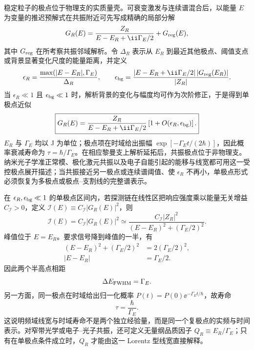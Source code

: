 稳定粒子的极点位于物理支的实质量壳。可衰变激发与连续谱混合后，以能量 $E$ 为变量的推迟预解式在共振附近可先写成精确的局部分解
\begin{equation*}
 G_R(E)
 =\frac{Z_R}{E-E_R+\ii\Gamma_E/2}+G_{\rm reg}(E),
\end{equation*}
其中 $G_{\rm reg}$ 在所考察共振邻域解析。令 $\Delta_R$ 表示从 $E_R$ 到最近其他极点、阈值支点或背景显著变化尺度的能量距离，并定义
\begin{equation*}
 \epsilon_R
 =\frac{\max(|E-E_R|,\Gamma_E)}{\Delta_R},
 \qquad
 \epsilon_{\rm bg}
 =\frac{|E-E_R+\ii\Gamma_E/2|\,|G_{\rm reg}(E_R)|}{|Z_R|}.
\end{equation*}
当 $\epsilon_R\ll1$ 且 $\epsilon_{\rm bg}\ll1$ 时，解析背景的变化与幅度均可作为次阶修正，于是得到单极点近似
\begin{equation}
 \boxed{
 G_R(E)
 =\frac{Z_R}{E-E_R+\ii\Gamma_E/2}
 \left[1+O(\epsilon_R,\epsilon_{\rm bg})\right].}
 \label{eq:resonance-pole-SI-r12}
\end{equation}
$E_R$ 与 $\Gamma_E$ 均以 J 为单位；极点项在时域给出振幅 $\exp[-\Gamma_E t/(2\hbar)]$，因此概率衰减寿命为 $\tau=\hbar/\Gamma_E$。在相应黎曼支上解析延拓后，共振极点位于非物理支。纳米光子学准正常模、极化激元共振以及电子自能引起的能移与线宽都可用这一受控极点展开描述；当共振接近另一极点或连续谱阈值、使 $\epsilon_R$ 不再小，单极点形式必须恢复为多极点或极点--支割线的完整谱表示。

\begin{exbox}[由共振极点直接读出线宽与寿命]
在 $\epsilon_R,\epsilon_{\rm bg}\ll1$ 的单极点区间内，若探测链在线性区把响应强度乘以能量无关增益 $C_{\mathcal I}>0$，定义 $\mathcal I(E)\equiv C_{\mathcal I}|G_R(E)|^2$，则
\begin{equation}
 \mathcal I(E)
 =C_{\mathcal I}|G_R(E)|^2
 \simeq
 \frac{C_{\mathcal I}|Z_R|^2}{(E-E_R)^2+(\Gamma_E/2)^2}.
 \label{eq:resonance-lorentzian-example-dp48}
\end{equation}
峰值位于 $E=E_R$。要求信号降到峰值的一半，有
\begin{align*}
 (E-E_R)^2+(\Gamma_E/2)^2
 &=2(\Gamma_E/2)^2,\\
 |E-E_R|&=\Gamma_E/2.
\end{align*}
因此两个半高点相距
\begin{equation*}
 \Delta E_{\rm FWHM}=\Gamma_E.
\end{equation*}
另一方面，同一极点在时域给出归一化概率
$P(t)=P(0)\ee^{-\Gamma_E t/\hbar}$，故寿命
\begin{equation*}
 \tau=\frac{\hbar}{\Gamma_E}.
\end{equation*}
这说明频域线宽与时域寿命不是两个独立经验量，而是同一个复极点的实频与时间表示。对窄带光学或电子--光子共振，还可定义无量纲品质因子 $Q_R\equiv E_R/\Gamma_E$；只有在单极点条件成立时，$Q_R$ 才能由这一 Lorentz 型线宽直接解释。
\end{exbox}



